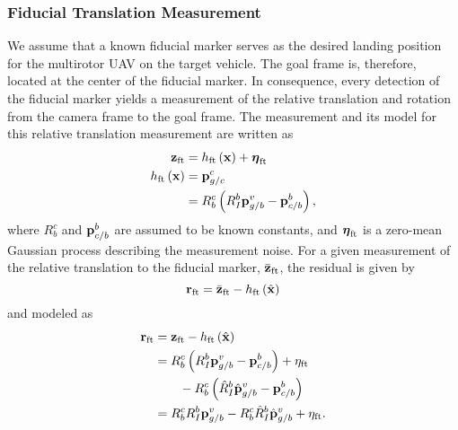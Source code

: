 \subsubsection{Fiducial Translation Measurement}
We assume that a known fiducial marker serves as the desired landing position
for the multirotor UAV on the target vehicle. The goal frame is, therefore,
located at the center of the fiducial marker. In consequence, every detection of the fiducial
marker yields a measurement of the relative translation and rotation from the
camera frame to the goal frame.
The measurement and its model for this relative translation measurement
are written as
\begin{align}
  \boldsymbol{\mathrm{z}}_{\text{ft}} &=
  h_{\text{ft}} \left( \boldsymbol{\mathrm{x}} \right) + \boldsymbol{\mathrm{\eta}}_{\text{ft}} \\
  h_{\text{ft}} \left( \boldsymbol{\mathrm{x}} \right) &=
  \boldsymbol{\mathrm{p}}_{g/c}^c \\
  &= R_b^c \left( R_I^b \boldsymbol{\mathrm{p}}_{g/b}^v -
  \boldsymbol{\mathrm{p}}_{c/b}^b \right),
\end{align}
where $R_b^c$ and $\boldsymbol{\mathrm{p}}_{c/b}^b$ are assumed to be known constants, and
$\boldsymbol{\mathrm{\eta}}_{\text{ft}}$ is a zero-mean Gaussian process describing the
measurement noise.
For a given measurement of the relative translation to the fiducial marker,
$\bar{\boldsymbol{\mathrm{z}}}_{\text{ft}}$, the residual is given by
\begin{equation}
  \boldsymbol{\mathrm{r}}_{\text{ft}} = \bar{\boldsymbol{\mathrm{z}}}_{\text{ft}} - h_{\text{ft}} \left( \hat{\boldsymbol{\mathrm{x}}}
  \right)
\end{equation}
and modeled as
\begin{align}
  \vect{r}_{\text{ft}} &=  \vect{z}_{\text{ft}} - h_{\text{ft}} \left( \hat{\x}
  \right) \\
                       &= R_b^c \left( R_I^b \vect{p}_{g/b}^v -
                         \vect{p}_{c/b}^b \right)  +\eta_{\text{ft}} \\
                       & \qquad - R_b^c \left( \hat{R}_I^b \hat{\vect{p}}_{g/b}^v -
    \vect{p}_{c/b}^b \right)  \nonumber \\
                       &= R_b^c R_I^b \vect{p}_{g/b}^v 
                          - R_b^c \hat{R}_I^b \hat{\vect{p}}_{g/b}^v +
                          \eta_{\text{ft}}.
                          \label{eq:rft_1}
\end{align}

